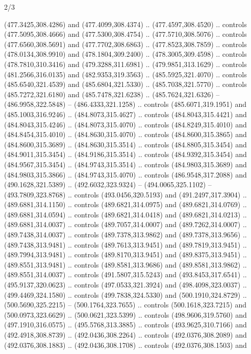 \begin{flagdescription}{2/3}
\begin{scope}[xshift=0.5\flaglength,yshift=0.5\flagwidth,scale=\flagwidth/495.65]
\begin{scope}[y=0.8pt, x=0.8pt, yscale=-1,shift={(-463.76,-309.78)}]
  (477.3425,308.4286) and (477.4099,308.4374) .. (477.4597,308.4520) .. controls
  (477.5095,308.4666) and (477.5300,308.4754) .. (477.5710,308.5076) .. controls
  (477.6560,308.5691) and (477.7702,308.6863) .. (477.8523,308.7859) .. controls
  (478.0134,308.9910) and (478.1804,309.2400) .. (478.3005,309.4598) .. controls
  (478.7810,310.3416) and (479.3288,311.6981) .. (479.9851,313.1629) .. controls
  (481.2566,316.0135) and (482.9353,319.3563) .. (485.5925,321.4070) .. controls
  (485.6540,321.4539) and (485.6804,321.5330) .. (485.7038,321.5770) .. controls
  (485.7272,321.6180) and (485.7478,321.6238) .. (485.7624,321.6326) --
  (486.9958,322.5848) -- (486.4333,321.1258) .. controls (485.6071,319.1951) and
  (485.1003,316.9246) .. (484.8073,315.4627) .. controls (484.8043,315.4421) and
  (484.8043,315.4246) .. (484.8073,315.4070) .. controls (484.8249,315.4010) and
  (484.8454,315.4010) .. (484.8630,315.4070) .. controls (484.8600,315.3865) and
  (484.8600,315.3689) .. (484.8630,315.3514) .. controls (484.8805,315.3454) and
  (484.9011,315.3454) .. (484.9186,315.3514) .. controls (484.9392,315.3454) and
  (484.9567,315.3454) .. (484.9743,315.3514) .. controls (484.9803,315.3689) and
  (484.9803,315.3866) .. (484.9743,315.4070) .. controls (486.9548,317.2088) and
  (490.1628,321.5389) .. (492.6032,323.9324) -- (494.0065,325.1102) --
  (493.7809,323.8768) .. controls (493.0456,320.5193) and (491.2497,317.3904) ..
  (489.6881,314.1150) .. controls (489.6821,314.0975) and (489.6821,314.0769) ..
  (489.6881,314.0594) .. controls (489.6821,314.0418) and (489.6821,314.0213) ..
  (489.6881,314.0037) .. controls (489.7057,314.0007) and (489.7262,314.0007) ..
  (489.7438,314.0037) .. controls (489.7378,313.9862) and (489.7378,313.9656) ..
  (489.7438,313.9481) .. controls (489.7613,313.9451) and (489.7819,313.9451) ..
  (489.7994,313.9481) .. controls (489.8170,313.9451) and (489.8375,313.9451) ..
  (489.8551,313.9481) .. controls (489.8581,313.9686) and (489.8581,313.9862) ..
  (489.8551,314.0037) .. controls (491.5807,315.5243) and (493.8453,317.6541) ..
  (495.9137,320.0623) .. controls (497.0533,321.3924) and (498.4098,323.0037) ..
  (499.4469,324.1580) .. controls (499.7838,324.5330) and (500.1910,324.8729) ..
  (500.5690,325.2215) -- (500.1764,323.7655) .. controls (500.1618,323.7215) and
  (500.0973,323.6629) .. (500.0621,323.5399) .. controls (498.9606,319.5760) and
  (497.1910,316.0575) .. (495.5768,313.3885) .. controls (493.9625,310.7166) and
  (492.4918,308.8739) .. (492.0436,308.2264) .. controls (492.0376,308.2089) and
  (492.0376,308.1883) .. (492.0436,308.1708) .. controls (492.0376,308.1503) and

\end{scope}
\end{scope}
\end{flagdescription}
